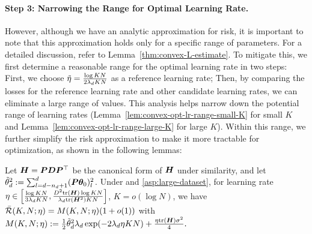 \paragraph{Step 3: Narrowing the Range for Optimal Learning Rate.}
However, although we have an analytic approximation for risk, it is important to note that this approximation holds only for a specific range of parameters.
For a detailed discussion, refer to Lemma~\ref{thm:convex-L-estimate}.
To mitigate this, we first determine a reasonable range for the optimal learning rate in two steps: First, we choose $\Tilde{\eta} = \frac{\log KN}{2\lambda_d KN}$ as a reference learning rate; Then, by comparing the losses for the reference learning rate and other candidate learning rates, we can eliminate a large range of values. 
This analysis helps narrow down the potential range of learning rates (Lemma~\ref{lem:convex-opt-lr-range-small-K} for small $K$ and Lemma~\ref{lem:convex-opt-lr-range-large-K} for large $K$). Within this range, we further simplify the risk approximation to make it more tractable for optimization, as shown in the following lemmas:
\begin{lemma}[Small $K$]
\label{lem:convex-L-approx-small-K-new}
    Let ${\bm{H}} = {\bm{P}}{\bm{D}}{\bm{P}}^{\top}$ be the canonical form of ${\bm{H}}$ under similarity, and let $\Tilde{\theta}_{d}^2 := \sum_{l=d-n_d+1}^d({\bm{P}}{\bm{\theta}}_0)_{l}^2$.
    Under  and \ref{asp:large-dataset}, for learning rate $\eta \in \left[\frac{\log KN}{3\lambda_d KN}, \frac{D^2 \mathrm{tr}({\bm{H}})\log KN}{\lambda_d \mathrm{tr}({\bm{H}}^2)KN} \right]$, $K = o(\log N)$, we have $\Bar{\mathcal{R}}(K, N;\eta) = M(K, N;\eta)(1+ o(1))$ with $M(K, N;\eta) := \frac{1}{2}\Tilde{\theta}_d^2 \lambda_d \exp(-2\lambda_d \eta KN)+\frac{\eta\mathrm{tr}({\bm{H}})\sigma^2}{4}.$
\end{lemma}

